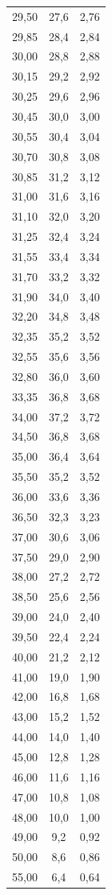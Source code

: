 \begin{table}
\begin{tabular}{S S S}
   29,50 & 27,6 & 2,76\\
   29,85 & 28,4 & 2,84\\
   30,00 & 28,8 & 2,88\\
   30,15 & 29,2 & 2,92\\
   30,25 & 29,6 & 2,96\\
   30,45 & 30,0 & 3,00\\
   30,55 & 30,4 & 3,04\\
   30,70 & 30,8 & 3,08\\
   30,85 & 31,2 & 3,12\\
   31,00 & 31,6 & 3,16\\
   31,10 & 32,0 & 3,20\\
   31,25 & 32,4 & 3,24\\
   31,55 & 33,4 & 3,34\\
   31,70 & 33,2 & 3,32\\
   31,90 & 34,0 & 3,40\\
   32,20 & 34,8 & 3,48\\
   32,35 & 35,2 & 3,52\\
   32,55 & 35,6 & 3,56\\
   32,80 & 36,0 & 3,60\\
   33,35 & 36,8 & 3,68\\
   34,00 & 37,2 & 3,72\\
   34,50 & 36,8 & 3,68\\
   35,00 & 36,4 & 3,64\\
   35,50 & 35,2 & 3,52\\
   36,00 & 33,6 & 3,36\\
   36,50 & 32,3 & 3,23\\
   37,00 & 30,6 & 3,06\\
   37,50 & 29,0 & 2,90\\
   38,00 & 27,2 & 2,72\\
   38,50 & 25,6 & 2,56\\
   39,00 & 24,0 & 2,40\\
   39,50 & 22,4 & 2,24\\
   40,00 & 21,2 & 2,12\\
   41,00 & 19,0 & 1,90\\
   42,00 & 16,8 & 1,68\\
   43,00 & 15,2 & 1,52\\
   44,00 & 14,0 & 1,40\\
   45,00 & 12,8 & 1,28\\
   46,00 & 11,6 & 1,16\\
   47,00 & 10,8 & 1,08\\
   48,00 & 10,0 & 1,00\\
   49,00 & 9,2 & 0,92\\
   50,00 & 8,6 & 0,86\\
   55,00 & 6,4 & 0,64\\
\bottomrule
\end{tabular}
\end{table}
